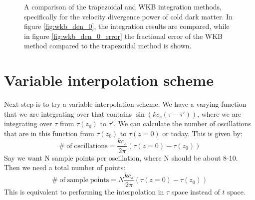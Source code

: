\documentclass[superscriptaddress,prd]{revtex4}
\begin{document}
\begin{figure}[h!]
  \centering
  \caption{A comparison of the trapezoidal and WKB integration
    methods, specifically for the velocity divergence power of cold
    dark matter.  In figure \ref{fig:wkb_den_0}, the integration results
  are compared, while in figure \ref{fig:wkb_den_0_error} the fractional
error of the WKB method compared to the trapezoidal method is shown.}\label{fig:wkb_den}
\end{figure}

\section{Variable interpolation scheme}
Next step is to try a variable interpolation scheme.  We have a varying function that we
are integrating over that contains $\sin ( k c_s (\tau - \tau') )$,
where we are integrating over $\tau$ from $\tau(z_0)$ to $\tau'$.  We
can calculate the number of oscillations that are in this function
from $\tau(z_0)$ to $\tau(z=0)$ or today.  This is given by:
\begin{equation}
  \mathrm{\#\;of\;oscillations} = \frac{ k c_s}{2 \pi}
  (\tau(z=0)-\tau(z_0))
\end{equation}
Say we want N sample points per oscillation, where N should be about
8-10.  Then we need a total number of points:
\begin{equation}
  \mathrm{ \#\;of\;sample\;points} = N \frac{ k c_s } {2 \pi}
  (\tau(z=0)-\tau(z_0)) 
\end{equation}
This is equivalent to performing the interpolation in $\tau$ space
instead of $t$ space.
\end{document}
